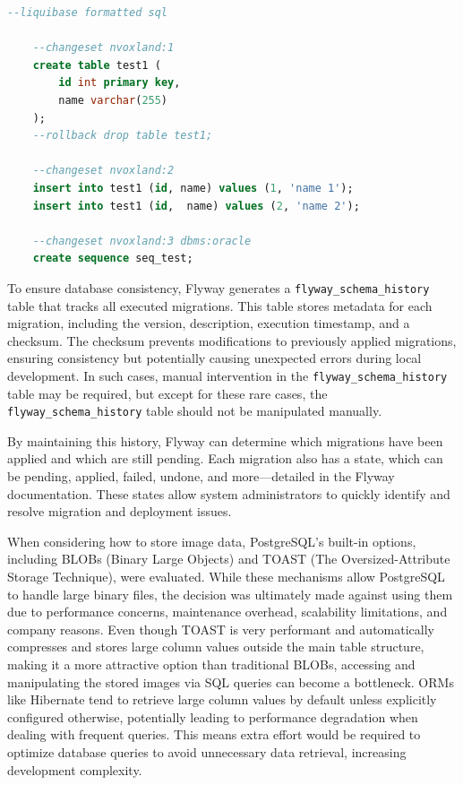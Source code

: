 \begin{lstlisting}[language=Sql,caption=Liquibase Example Changelog,label=lst:liquibase:example]
    --liquibase formatted sql
    
    --changeset nvoxland:1
    create table test1 (  
        id int primary key,
        name varchar(255)  
    );  
    --rollback drop table test1; 
    
    --changeset nvoxland:2 
    insert into test1 (id, name) values (1, 'name 1');
    insert into test1 (id,  name) values (2, 'name 2');  
    
    --changeset nvoxland:3 dbms:oracle
    create sequence seq_test;
\end{lstlisting}
    
To ensure database consistency, Flyway generates a \texttt{flyway\_schema\_history} table that tracks all executed migrations. This table stores metadata for each migration, including the version, description, execution timestamp, and a checksum. The checksum prevents modifications to previously applied migrations, ensuring consistency but potentially causing unexpected errors during local development. In such cases, manual intervention in the \texttt{flyway\_schema\_history} table may be required, but except for these rare cases, the \texttt{flyway\_schema\_history} table should not be manipulated manually.

By maintaining this history, Flyway can determine which migrations have been applied and which are still pending. Each migration also has a state, which can be pending, applied, failed, undone, and more—detailed in the Flyway documentation. These states allow system administrators to quickly identify and resolve migration and deployment issues.

When considering how to store image data, PostgreSQL’s built-in options, including BLOBs (Binary Large Objects) and TOAST \cite{PostgreSQLDocs} (The Oversized-Attribute Storage Technique), were evaluated. While these mechanisms allow PostgreSQL to handle large binary files, the decision was ultimately made against using them due to performance concerns, maintenance overhead, scalability limitations, and company reasons.
Even though TOAST is very performant and automatically compresses and stores large column values outside the main table structure, making it a more attractive option than traditional BLOBs, accessing and manipulating the stored images via SQL queries can become a bottleneck. ORMs like Hibernate tend to retrieve large column values by default unless explicitly configured otherwise, potentially leading to performance degradation when dealing with frequent queries. This means extra effort would be required to optimize database queries to avoid unnecessary data retrieval, increasing development complexity.


